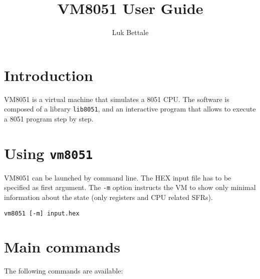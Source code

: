 \documentclass{article}
\title{VM8051 User Guide}
\author{Luk Bettale}
\date{}
\begin{document}
\maketitle

\section*{Introduction}
VM8051 is a virtual machine that simulates a 8051 CPU. The software is
composed of a library \texttt{lib8051}, and an interactive program
that allows to execute a 8051 program step by step.

\section*{Using \texttt{vm8051}}
VM8051 can be launched by command line. The HEX input file has to
be specified as first argument. The \texttt{-m} option instructs the
VM to show only minimal information about the state (only registers
and CPU related SFRs).

\begin{verbatim}
vm8051 [-m] input.hex
\end{verbatim}

\section*{Main commands}
The following commands are available:
\end{document}
